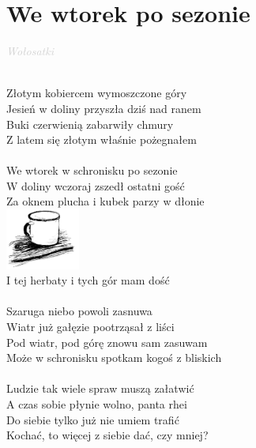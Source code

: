 \documentclass[a5paper, 10pt]{book}
\begin{document}
\section{We wtorek po sezonie}\textcolor{lightgray}{\textit{Wołosatki}}\\~\\
\begin{minipage}[t]{0.7\textwidth}
Złotym kobiercem wymoszczone góry\\
Jesień w doliny przyszła dziś nad ranem\\
Buki czerwienią zabarwiły chmury\\
Z latem się złotym właśnie pożegnałem\\
\\
\hspace*{5mm}We wtorek w schronisku po sezonie\\
\hspace*{5mm}W doliny wczoraj zszedł ostatni gość\\
\hspace*{5mm}Za oknem plucha i kubek parzy w dłonie\\
\includegraphics[height=2cm, right]{we_wtorek_po_sezonie.png}\vspace*{-2.1cm}\\
\hspace*{5mm}I tej herbaty i tych gór mam dość\\
\\
Szaruga niebo powoli zasnuwa\\
Wiatr już gałęzie pootrząsał z liści\\
Pod wiatr, pod górę znowu sam zasuwam\\
Może w schronisku spotkam kogoś z bliskich\\
\\
Ludzie tak wiele spraw muszą załatwić\\
A czas sobie płynie wolno, panta rhei\\
Do siebie tylko już nie umiem trafić\\
Kochać, to więcej z siebie dać, czy mniej?\\
\end{minipage}
\end{document}
